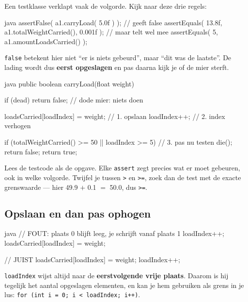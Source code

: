 \documentclass[a4paper,11pt]{article}
\begin{document}
Een testklasse verklapt vaak de volgorde. Kijk naar deze drie regels:

\begin{codeblock}{java}
    assertFalse( a1.carryLoad( 5.0f ) );                     // geeft false
    assertEquals( 13.8f, a1.totalWeightCarried(), 0.001f );  // maar telt wel mee
    assertEquals( 5, a1.amountLoadsCarried() );
\end{codeblock}

\texttt{false} betekent hier niet ``er is niets gebeurd'', maar ``dit was de
laatste''. De lading wordt dus \textbf{eerst opgeslagen} en pas daarna kijk je of
de mier sterft.

\begin{codeblock}{java}
    public boolean carryLoad(float weight)
    {
            if (dead)
            {
                    return false;              // dode mier: niets doen
                }

            loadsCarried[loadIndex] = weight;   // 1. opslaan
            loadIndex++;                        // 2. index verhogen

            if (totalWeightCarried() >= 50 || loadIndex >= 5)   // 3. pas nu testen
                {
                    die();
                    return false;
                }
            return true;
        }
\end{codeblock}

\begin{examenbox}
    Lees de testcode als de opgave. Elke \texttt{assert} zegt precies wat er moet
    gebeuren, ook in welke volgorde. Twijfel je tussen \texttt{>} en \texttt{>=},
    zoek dan de test met de exacte grenswaarde --- hier 49.9 $+$ 0.1 $=$ 50.0, dus
    \texttt{>=}.
\end{examenbox}

\subsection{Opslaan en dan pas ophogen}

\begin{codeblock}{java}
    // FOUT: plaats 0 blijft leeg, je schrijft vanaf plaats 1
    loadIndex++;
    loadsCarried[loadIndex] = weight;

    // JUIST
    loadsCarried[loadIndex] = weight;
    loadIndex++;
\end{codeblock}

\texttt{loadIndex} wijst altijd naar de \textbf{eerstvolgende vrije plaats}.
Daarom is hij tegelijk het aantal opgeslagen elementen, en kan je hem gebruiken
als grens in je lus: \texttt{for (int i = 0; i < loadIndex; i++)}.
\end{document}

